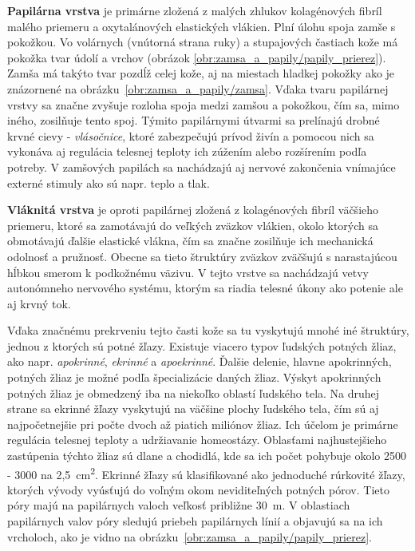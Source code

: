   \textbf{Papilárna vrstva} je primárne zložená z malých zhlukov kolagénových fibríl malého priemeru a oxytalánových elastických vlákien.
  Plní úlohu spoja zamše s pokožkou. Vo volárnych (vnútorná strana ruky) a stupajových častiach kože má pokožka tvar údolí a vrchov
  (obrázok \ref{obr:zamsa_a_papily/papily_prierez}). Zamša má takýto tvar pozdĺž celej kože, aj na miestach hladkej pokožky ako je znázornené na
  obrázku~{\ref{obr:zamsa_a_papily/zamsa}}.
  Vďaka tvaru papilárnej vrstvy sa značne zvyšuje rozloha spoja medzi zamšou a pokožkou, čím sa, mimo iného, zosilňuje tento spoj.
  Týmito papilárnymi útvarmi sa prelínajú drobné krvné cievy - \emph{vlásočnice}, ktoré zabezpečujú prívod živín a pomocou nich sa vykonáva aj regulácia telesnej
  teploty ich zúžením alebo rozšírením podľa potreby. V zamšových papilách sa nachádzajú aj nervové zakončenia vnímajúce externé stimuly ako sú napr. teplo a tlak.

  \textbf{Vláknitá vrstva} je oproti papilárnej zložená z kolagénových fibríl väčšieho priemeru, ktoré sa zamotávajú do veľkých zväzkov vlákien,
  okolo ktorých sa obmotávajú ďalšie elastické vlákna, čím sa značne zosilňuje ich mechanická odolnosť a pružnosť. Obecne sa tieto štruktúry zväzkov zväčšujú
  s narastajúcou hĺbkou smerom k podkožnému väzivu. V tejto vrstve sa nachádzajú vetvy autonómneho nervového systému, ktorým sa riadia telesné úkony ako potenie
  ale aj krvný tok.

  Vďaka značnému prekrveniu tejto časti kože sa tu vyskytujú mnohé iné štruktúry, jednou z ktorých sú potné žľazy. Existuje viacero typov ľudských
  potných žliaz, ako napr. \emph{apokrinné}, \emph{ekrinné} a \emph{apoekrinné}. Ďalšie delenie, hlavne apokrinných, potných žliaz je možné podľa špecializácie
  daných žliaz. Výskyt apokrinných potných žliaz je obmedzený iba na niekoľko oblastí ľudského tela. Na druhej strane sa ekrinné žľazy vyskytujú na väčšine plochy
  ľudského tela, čím sú aj najpočetnejšie pri počte dvoch až piatich miliónov žliaz. Ich účelom je primárne regulácia telesnej teploty a udržiavanie homeostázy.
  Oblasťami najhustejšieho zastúpenia týchto žliaz sú dlane a chodidlá, kde sa ich počet pohybuje okolo 2500 - 3000 na 2,5~cm\textsuperscript{2}.
  Ekrinné žľazy sú klasifikované ako jednoduché rúrkovité žľazy, ktorých vývody vyúsťujú do voľným okom neviditeľných potných pórov. Tieto póry majú
  na papilárnych valoch veľkosť približne 30~{\textmugreek{}}m. V oblastiach papilárnych valov póry sledujú priebeh papilárnych línií a objavujú sa na ich
  vrcholoch, ako je vidno na obrázku~{\ref{obr:zamsa_a_papily/papily_prierez}}.
  
